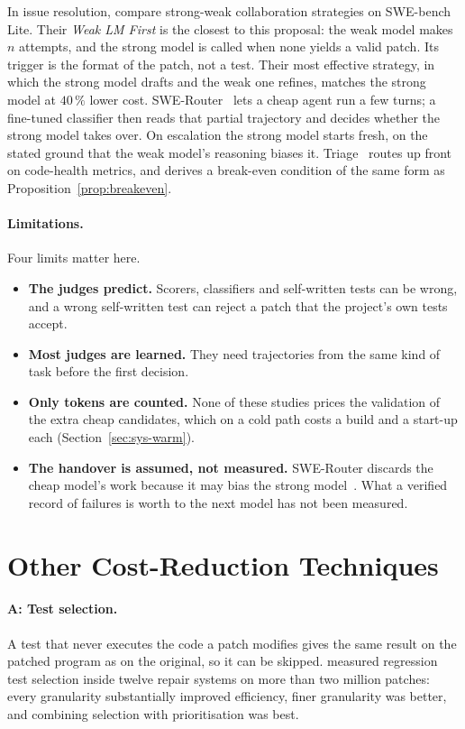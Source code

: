 In issue resolution, \citet{gandhi2025strongweak} compare strong-weak
collaboration strategies on SWE-bench Lite. Their \emph{Weak LM First} is the
closest to this proposal: the weak model makes $n$ attempts, and the strong
model is called when none yields a valid patch. Its trigger is the format of
the patch, not a test. Their most effective strategy, in which the strong
model drafts and the weak one refines, matches the strong model at $40\,\%$
lower cost. SWE-Router~\citep{son2026swerouter} lets a cheap agent run a few
turns; a fine-tuned classifier then reads that partial trajectory and decides
whether the strong model takes over. On escalation the strong model starts
fresh, on the stated ground that the weak model's reasoning biases it.
Triage~\citep{madeyski2026triage} routes up front on code-health metrics, and
derives a break-even condition of the same form as
Proposition~\ref{prop:breakeven}.

\paragraph{Limitations.} Four limits matter here.
\begin{itemize}
\item \textbf{The judges predict.} Scorers, classifiers and self-written
tests can be wrong, and a wrong self-written test can reject a patch that the
project's own tests accept.
\item \textbf{Most judges are learned.} They need trajectories from the same
kind of task before the first decision.
\item \textbf{Only tokens are counted.} None of these studies prices the
validation of the extra cheap candidates, which on a cold path costs a build
and a start-up each (Section~\ref{sec:sys-warm}).
\item \textbf{The handover is assumed, not measured.} SWE-Router discards the
cheap model's work because it may bias the strong
model~\citep{son2026swerouter}. What a verified record of failures is worth to
the next model has not been measured.
\end{itemize}

\section{Other Cost-Reduction Techniques}
\label{sec:rel-other}

\paragraph{A: Test selection.} A test that never executes the code a patch
modifies gives the same result on the patched program as on the original, so
it can be skipped. \citet{lou2024aprregression} measured regression test
selection inside twelve repair systems on more than two million patches: every
granularity substantially improved efficiency, finer granularity was better,
and combining selection with prioritisation was best.

